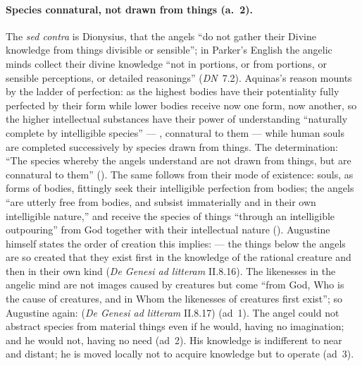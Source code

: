 \paragraph{Species connatural, not drawn from things (a.~2).} The
\emph{sed contra} is Dionysius, that the angels ``do not gather their
Divine knowledge from things divisible or sensible''; in Parker's English
the angelic minds collect their divine knowledge
``not in portions, or from portions, or sensible perceptions, or detailed
reasonings'' (\emph{DN}~7.2). Aquinas's reason mounts by the ladder of
perfection: as the highest bodies have their potentiality fully perfected
by their form while lower bodies receive now one form, now another, so the
higher intellectual substances have their power of understanding
``naturally complete by intelligible species'' --- , connatural to them --- while human souls are
completed successively by species drawn from things. The determination:
``The species whereby the angels understand are not drawn from things, but
are connatural to them'' (). The same follows from their
mode of existence: souls, as forms of bodies, fittingly seek their
intelligible perfection from bodies; the angels ``are utterly free from
bodies, and subsist immaterially and in their own intelligible nature,''
and receive the species of things
``through an intelligible outpouring'' from God together with their
intellectual nature (). Augustine himself states
the order of creation this implies:  --- the things below the angels are so created that they
exist first in the knowledge of the rational creature and then in their
own kind (\emph{De Genesi ad litteram} II.8.16). The likenesses in the
angelic mind are not images caused by creatures but come ``from God, Who
is the cause of creatures, and in Whom the likenesses of creatures first
exist''; so Augustine again:  (\emph{De Genesi ad
litteram} II.8.17) (ad~1). The angel could not abstract species from
material things even if he would, having no imagination; and he would not,
having no need (ad~2). His knowledge is indifferent to near and distant;
he is moved locally not to acquire knowledge but to operate (ad~3).

